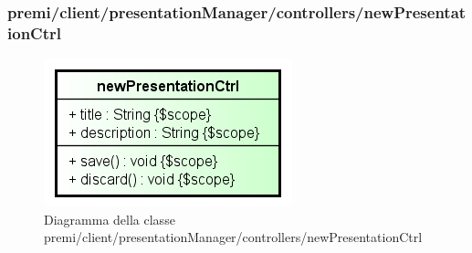\subsubsection{premi/client/presentationManager/controllers/newPresentationCtrl}
\begin{figure}[H]
\begin{center}
\includegraphics[scale=0.90]{img/diacla/newPresentationCtrl.png}
\caption{Diagramma della classe premi/client/presentationManager/controllers/newPresentationCtrl}
\end{center}
\end{figure}




